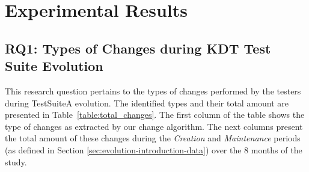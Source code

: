 \section{Experimental Results}
\label{sec:evolution-results}

\subsection{RQ1: Types of Changes during KDT  Test Suite Evolution}
\label{sec:evolution-results-rq1}

This research question pertains to the types of changes performed by the testers during TestSuiteA evolution. The identified types and their total amount are presented in Table~\ref{table:total_changes}. The first column of the table shows the type of changes as extracted by our change algorithm. The next columns present the total amount of these changes during the \emph{Creation} and \emph{Maintenance} periods (as defined in Section \ref{sec:evolution-introduction-data}) over the 8 months of the study.


